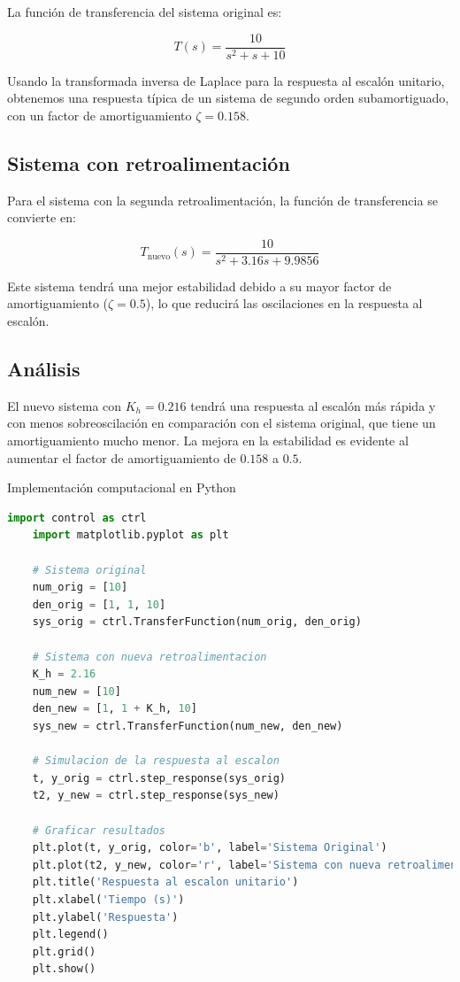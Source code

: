 \documentclass[10pt]{article}
\theoremstyle{definition}
\theoremstyle{remark}
\theoremstyle{definition}
\numberwithin{equation}{prob}
\begin{document}
La función de transferencia del sistema original es:

\[
T(s) = \frac{10}{s^2 + s + 10}
\]

Usando la transformada inversa de Laplace para la respuesta al escalón unitario, obtenemos una respuesta típica de un sistema de segundo orden subamortiguado, con un factor de amortiguamiento \(\zeta = 0.158\).

\subsection*{Sistema con retroalimentación}

Para el sistema con la segunda retroalimentación, la función de transferencia se convierte en:

\[
T_{\text{nuevo}}(s) = \frac{10}{s^2 + 3.16s + 9.9856}
\]

Este sistema tendrá una mejor estabilidad debido a su mayor factor de amortiguamiento (\(\zeta = 0.5\)), lo que reducirá las oscilaciones en la respuesta al escalón.

\subsection*{Análisis}

El nuevo sistema con \(K_h = 0.216\) tendrá una respuesta al escalón más rápida y con menos sobreoscilación en comparación con el sistema original, que tiene un amortiguamiento mucho menor. La mejora en la estabilidad es evidente al aumentar el factor de amortiguamiento de \(0.158\) a \(0.5\).

Implementación computacional en Python
\begin{lstlisting}[language=Python]
	import control as ctrl
	import matplotlib.pyplot as plt
	
	# Sistema original
	num_orig = [10]
	den_orig = [1, 1, 10]
	sys_orig = ctrl.TransferFunction(num_orig, den_orig)
	
	# Sistema con nueva retroalimentacion
	K_h = 2.16
	num_new = [10]
	den_new = [1, 1 + K_h, 10]
	sys_new = ctrl.TransferFunction(num_new, den_new)
	
	# Simulacion de la respuesta al escalon
	t, y_orig = ctrl.step_response(sys_orig)
	t2, y_new = ctrl.step_response(sys_new)

	# Graficar resultados
	plt.plot(t, y_orig, color='b', label='Sistema Original')
	plt.plot(t2, y_new, color='r', label='Sistema con nueva retroalimentacion')
	plt.title('Respuesta al escalon unitario')
	plt.xlabel('Tiempo (s)')
	plt.ylabel('Respuesta')
	plt.legend()
	plt.grid()
	plt.show()
\end{lstlisting}
\end{document}
